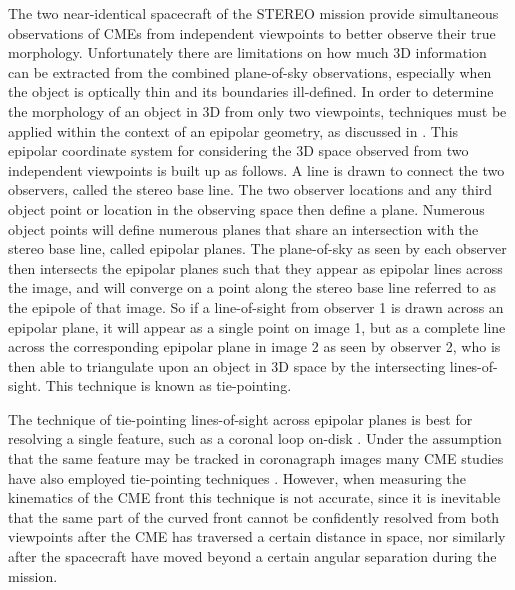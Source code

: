 \documentclass[preprint2]{aastex}
\begin{document}
The two near-identical spacecraft of the STEREO mission provide simultaneous observations of CMEs from independent viewpoints to better observe their true morphology. Unfortunately there are limitations on how much 3D information can be extracted from the combined plane-of-sky observations, especially when the object is optically thin and its boundaries ill-defined. In order to determine the morphology of an object in 3D from only two viewpoints, techniques must be applied within the context of an epipolar geometry, as discussed in \citep{2006astro.ph.12649I}. This epipolar coordinate system for considering the 3D space observed from two independent viewpoints is built up as follows. A line is drawn to connect the two observers, called the stereo base line. The two observer locations and any third object point or location in the observing space then define a plane. Numerous object points will define numerous planes that share an intersection with the stereo base line, called epipolar planes. The plane-of-sky as seen by each observer then intersects the epipolar planes such that they appear as epipolar lines across the image, and will converge on a point along the stereo base line referred to as the epipole of that image. So if a line-of-sight from observer 1 is drawn across an epipolar plane, it will appear as a single point on image 1, but as a complete line across the corresponding epipolar plane in image 2 as seen by observer 2, who is then able to triangulate upon an object in 3D space by the intersecting lines-of-sight. This technique is known as tie-pointing.

The technique of tie-pointing lines-of-sight across epipolar planes is best for resolving a single feature, such as a coronal loop on-disk \citep{2008ApJ...679..827A}. Under the assumption that the same feature may be tracked in coronagraph images many CME studies have also employed tie-pointing techniques \citep{2009SoPh..256...57L, 2009SoPh..259..213S, 2009SoPh..256..183T, 2008SoPh..252..385M, 2009SoPh..259..163W}. However, when measuring the kinematics of the CME front this technique is not accurate, since it is inevitable that the same part of the curved front cannot be confidently resolved from both viewpoints after the CME has traversed a certain distance in space, nor similarly after the spacecraft have moved beyond a certain angular separation during the mission. 
\end{document}
